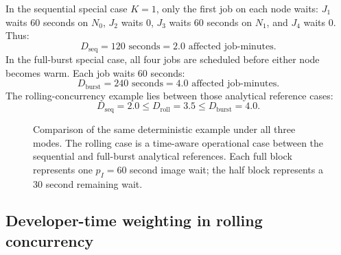 \documentclass[11pt,a4paper]{article}
\begin{document}
In the sequential special case \(K=1\), only the first job on each node waits: \(J_1\) waits 60 seconds on \(N_0\), \(J_2\) waits 0, \(J_3\) waits 60 seconds on \(N_1\), and \(J_4\) waits 0. Thus:
\begin{equation}
  D_{\mathrm{seq}} = 120\text{ seconds} = 2.0\text{ affected job-minutes}.
\end{equation}
In the full-burst special case, all four jobs are scheduled before either node becomes warm. Each job waits 60 seconds:
\begin{equation}
  D_{\mathrm{burst}} = 240\text{ seconds} = 4.0\text{ affected job-minutes}.
\end{equation}
The rolling-concurrency example lies between those analytical reference cases:
\begin{equation}
  D_{\mathrm{seq}} = 2.0
  \le
  D_{\mathrm{roll}} = 3.5
  \le
  D_{\mathrm{burst}} = 4.0.
\end{equation}

\begin{figure}[H]
\centering
{}
\caption{Comparison of the same deterministic example under all three modes. The rolling case is a time-aware operational case between the sequential and full-burst analytical references. Each full block represents one \(p_I=60\) second image wait; the half block represents a 30 second remaining wait.}
\label{fig:rolling-boundary-check}
\end{figure}


\subsection{Developer-time weighting in rolling concurrency}
\end{document}
